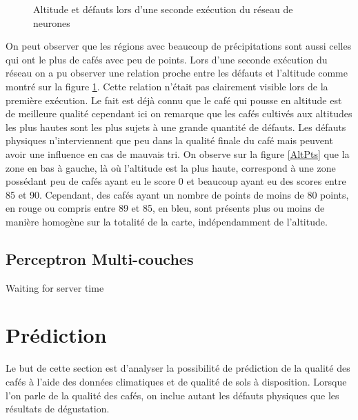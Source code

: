 \begin{figure}[H]
	\caption{\label{SecondSOMASNM}Altitude et défauts lors d'une seconde exécution du réseau de neurones}
	\centering
	\hfill
	\newline

	\centering
	\hfill
	\hfill
	\newline
	\centering 
\end{figure}

On peut observer que les régions avec beaucoup de précipitations sont aussi celles qui ont le plus de cafés avec peu de points. Lors d'une seconde exécution du réseau on a pu observer une relation proche entre les défauts et l'altitude comme montré sur la figure \ref{SecondSOMASNM}. Cette relation n'était pas clairement visible lors de la première exécution. Le fait est déjà connu que le café qui pousse en altitude est de meilleure qualité cependant ici on remarque que les cafés cultivés aux altitudes les plus hautes sont les plus sujets à une grande quantité de défauts. Les défauts physiques n'interviennent que peu dans la qualité finale du café mais peuvent avoir une influence en cas de mauvais tri. On observe sur la figure \ref{AltPts} que la zone en bas à gauche, là où l'altitude est la plus haute, correspond à une zone possédant peu de cafés ayant eu le score 0 et beaucoup ayant eu des scores entre 85 et 90. Cependant, des cafés ayant un nombre de points de moins de 80 points, en rouge ou compris entre 89 et 85, en bleu, sont présents plus ou moins de manière homogène sur la totalité de la carte, indépendamment de l'altitude.  

\newpage
\subsection{Perceptron Multi-couches}
Waiting for server time



\section{Prédiction}
Le but de cette section est d'analyser la possibilité de prédiction de la qualité des cafés à l'aide des données climatiques et de qualité de sols à disposition. Lorsque l'on parle de la qualité des cafés, on inclue autant les défauts physiques que les résultats de dégustation. 

